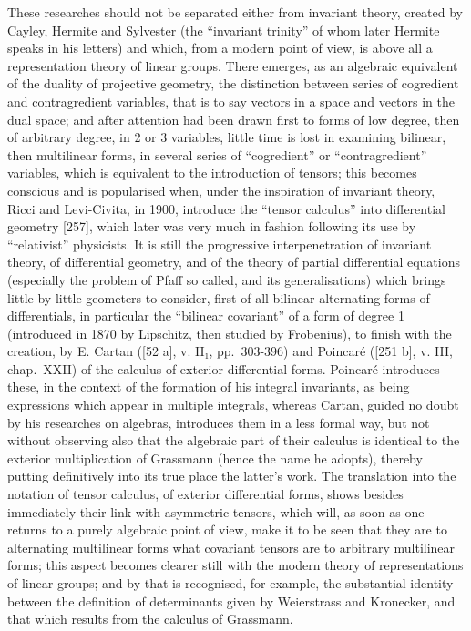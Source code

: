 These researches should not be separated either from invariant theory, created by Cayley, Hermite and Sylvester (the ``invariant trinity'' of whom later Hermite speaks in his letters) and which, from a modern point of view, is above all a representation theory of linear groups. There emerges, as an algebraic equivalent of the duality of projective geometry, the distinction between series of cogredient and contragredient variables, that is to say vectors in a space and vectors in the dual space; and after attention had been drawn first to forms of low degree, then of arbitrary degree, in 2 or 3 variables, little time is lost in examining bilinear, then multilinear forms, in several series of ``cogredient'' or ``contragredient'' variables, which is equivalent to the introduction of tensors; this becomes conscious and is popularised when, under the inspiration of invariant theory, Ricci and Levi-Civita, in 1900, introduce the ``tensor calculus'' into differential geometry {[}257{]}, which later was very much in fashion following its use by ``relativist'' physicists. It is still the progressive interpenetration of invariant theory, of differential geometry, and of the theory of partial differential equations (especially the problem of Pfaff so called, and its generalisations) which brings little by little geometers to consider, first of all bilinear alternating forms of differentials, in particular the ``bilinear covariant'' of a form of degree 1 (introduced in 1870 by Lipschitz, then studied by Frobenius), to finish with the creation, by E. Cartan ({[}52 a{]}, v. II₁, pp.~303-396) and Poincaré ({[}251 b{]}, v. III, chap.~XXII) of the calculus of exterior differential forms. Poincaré introduces these, in the context of the formation of his integral invariants, as being expressions which appear in multiple integrals, whereas Cartan, guided no doubt by his researches on algebras, introduces them in a less formal way, but not without observing also that the algebraic part of their calculus is identical to the exterior multiplication of Grassmann (hence the name he adopts), thereby putting definitively into its true place the latter's work. The translation into the notation of tensor calculus, of exterior differential forms, shows besides immediately their link with asymmetric tensors, which will, as soon as one returns to a purely algebraic point of view, make it to be seen that they are to alternating multilinear forms what covariant tensors are to arbitrary multilinear forms; this aspect becomes clearer still with the modern theory of representations of linear groups; and by that is recognised, for example, the substantial identity between the definition of determinants given by Weierstrass and Kronecker, and that which results from the calculus of Grassmann.

